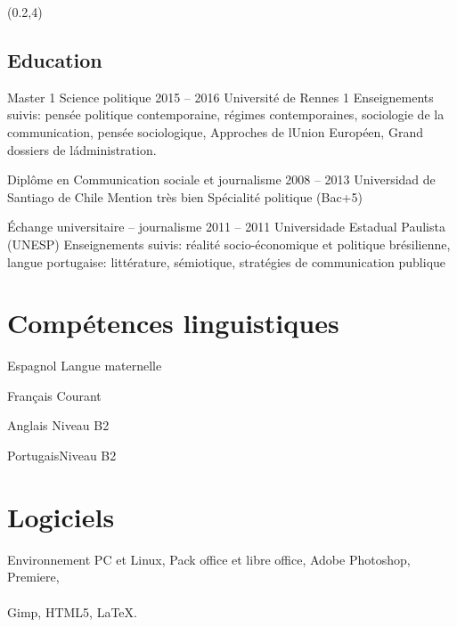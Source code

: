 \documentclass{tccv}
\begin{document}
\begin{textblock}{7}(0.2,4)
\begin{mdframed}

\section{Education}
\begin{yearlist}

\item[Master 1 Science politique]{2015 -- 2016}
     {Université de Rennes 1}
     {Enseignements suivis: pensée politique contemporaine, régimes contemporaines, sociologie de la communication, pensée sociologique, Approches de lUnion Européen, Grand dossiers de l\' administration.}


  

\item[Diplôme en Communication sociale et journalisme]{2008 -- 2013}
     {Universidad de Santiago de Chile}
     {Mention très bien
      Spécialité politique
      (Bac+5)}

     
\item[Échange universitaire -- journalisme]{2011 -- 2011}
     {Universidade Estadual Paulista (UNESP)}
     {Enseignements suivis: réalité socio-économique et politique brésilienne, langue portugaise: littérature, sémiotique, stratégies de communication publique}


\end{yearlist}
\end{mdframed}


\begin{mdframed}
\section{Compétences linguistiques}

\begin{factlist}
\item{Espagnol} {Langue maternelle}	
\item{Français} {Courant}	
\item{Anglais}  {Niveau B2}	
\item{Portugais}{Niveau B2}
\end{factlist}

\section{Logiciels}

Environnement PC et Linux,
Pack office et libre office,
Adobe Photoshop, Premiere, \\
 \\
Gimp,
HTML5,
\LaTeX.

\end{mdframed}
\end{textblock}
\end{document}

